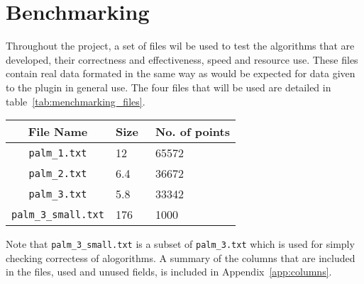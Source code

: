 
\section{Benchmarking}
\label{sec:benchmarking}

Throughout the project, a set of files wil be used to test the algorithms that
are developed, their correctness and effectiveness, speed and resource use.
These files contain real data formated in the same way as would be expected for
data given to the plugin in general use. The four files that will be used are
detailed in table~\ref{tab:menchmarking_files}.

\renewcommand{\arraystretch}{1.3}
\begin{tabu} to \linewidth {c X l}
	\toprule
	File Name & Size & No. of points \\
	\midrule
	\texttt{palm_1.txt} & \SI{12}{\mega\bytes} & 65572 \\
	\texttt{palm_2.txt} & \SI{6.4}{\mega\bytes} & 36672 \\
	\texttt{palm_3.txt} & \SI{5.8}{\mega\bytes} & 33342 \\
	\texttt{palm_3_small.txt} & \SI{176}{\kilo\bytes} & 1000 \\
	\bottomrule
\end{tabu}

Note that \texttt{palm_3_small.txt} is a subset of \texttt{palm_3.txt} which is
used for simply checking correctess of alogorithms. A summary of the columns
that are included in the files, used and unused fields, is included in
Appendix~\ref{app:columns}.

